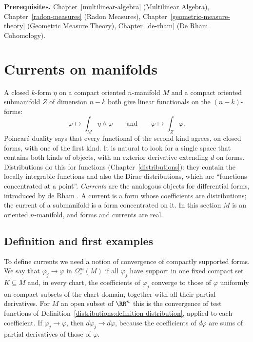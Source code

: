 \noindent\textbf{Prerequisites.} Chapter~\ref{multilinear-algebra} (Multilinear Algebra), Chapter~\ref{radon-measures} (Radon Measures), Chapter~\ref{geometric-measure-theory} (Geometric Measure Theory),
Chapter~\ref{de-rham} (De Rham Cohomology).

\section{Currents on manifolds}\label{currents:section-currents-manifold}

A closed $k$-form $\eta$ on a compact oriented $n$-manifold $M$ and a compact oriented submanifold $Z$ of dimension $n - k$ both give linear functionals on the $(n-k)$-forms:
\[
\varphi \longmapsto \int_M\eta \wedge \varphi \qquad \text{and} \qquad \varphi \longmapsto \int_Z\varphi .
\]
Poincar\'e duality says that every functional of the second kind agrees, on closed forms, with one of the first kind. It is natural to look for a single space that contains both kinds of objects,
with an exterior derivative extending $d$ on forms. Distributions do this for functions (Chapter~\ref{distributions}): they contain the locally integrable functions and also the Dirac
distributions, which are ``functions concentrated at a point''. \emph{Currents} are the analogous objects for differential forms, introduced by de Rham \cite{de-rham-book}. A current is a
form whose coefficients are distributions; the current of a submanifold is a form concentrated on it. In this section $M$ is an oriented $n$-manifold, and forms and currents are real.

\subsection{Definition and first examples}\label{currents:subsection-currents-definition}

To define currents we need a notion of convergence of compactly supported forms. We say that $\varphi_j \to \varphi$ in $\Omega^m_c(M)$ if all $\varphi_j$ have support in one fixed compact
set $K \subseteq M$ and, in every chart, the coefficients of $\varphi_j$ converge to those of $\varphi$ uniformly on compact subsets of the chart domain, together with all their partial
derivatives. For $M$ an open subset of $\RR^n$ this is the convergence of test functions of Definition~\ref{distributions:definition-distribution}, applied to each coefficient. If
$\varphi_j \to \varphi$, then $d\varphi_j \to d\varphi$, because the coefficients of $d\varphi$ are sums of partial derivatives of those of $\varphi$.


